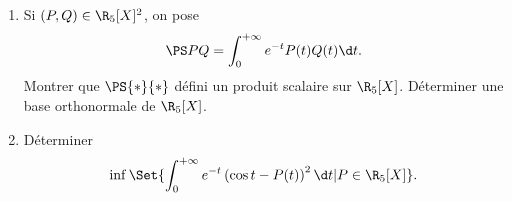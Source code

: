 \begin{enonce}
\begin{exercise}[ID={RMS 122-2 E1215 ENSAM PSI},subtitle={},tags={},difficulty={}]
\begin{enumerate}
  \item Si $(P,Q)\in\R_5[X]^2$, on pose
    \begin{equation*}
      \PS PQ=\int_0^{+\infty} e^{-t}P(t)Q(t)\d t.
    \end{equation*}
    Montrer que $\PS{*}{*}$ défini un produit scalaire sur $\R_5[X]$.
    Déterminer une base orthonormale de $\R_5[X]$.

  \item Déterminer
    \begin{equation*}
      \inf\Set{\int_0^{+\infty} e^{-t}\left( \cos t- P(t) \right)^2\d t | P\in\R_5[X]}.
    \end{equation*}
\end{enumerate}
\end{exercise}
\begin{solution}
\end{solution}
\end{enonce}
